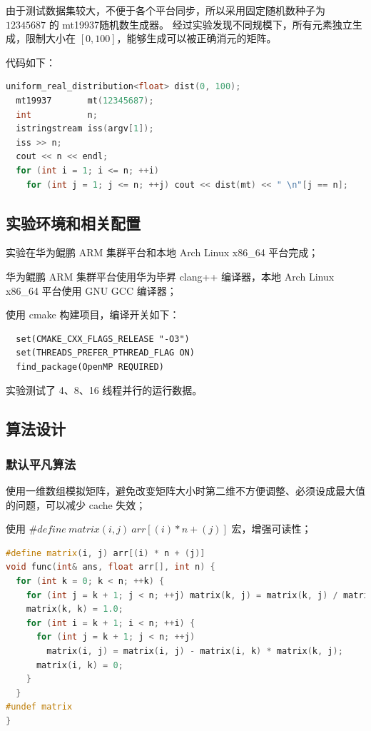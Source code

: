 \documentclass[a4paper]{article}
\begin{document}
由于测试数据集较大，不便于各个平台同步，所以采用固定随机数种子为 $12345687$ 的 mt19937随机数生成器。
经过实验发现不同规模下，所有元素独立生成，限制大小在 $[0, 100]$，能够生成可以被正确消元的矩阵。

代码如下：

\begin{lstlisting}[title=测试数据集生成器,frame=trbl,language={C++}]
  uniform_real_distribution<float> dist(0, 100);
  mt19937       mt(12345687);
  int           n;
  istringstream iss(argv[1]);
  iss >> n;
  cout << n << endl;
  for (int i = 1; i <= n; ++i)
    for (int j = 1; j <= n; ++j) cout << dist(mt) << " \n"[j == n];
\end{lstlisting}

\subsection{实验环境和相关配置}

实验在华为鲲鹏 ARM 集群平台和本地 Arch Linux x86\_64 平台完成；

华为鲲鹏 ARM 集群平台使用华为毕昇 clang++ 编译器，本地 Arch Linux x86\_64 平台使用 GNU GCC 编译器；

使用 cmake 构建项目，编译开关如下：

\begin{verbatim}
  set(CMAKE_CXX_FLAGS_RELEASE "-O3")
  set(THREADS_PREFER_PTHREAD_FLAG ON)
  find_package(OpenMP REQUIRED)
\end{verbatim}

实验测试了 4、8、16 线程并行的运行数据。

\subsection{算法设计}

\subsubsection{默认平凡算法}

使用一维数组模拟矩阵，避免改变矩阵大小时第二维不方便调整、必须设成最大值的问题，可以减少 cache 失效；

使用 $\#define\ matrix(i, j)\ arr[(i) * n + (j)]$ 宏，增强可读性；

\begin{lstlisting}[title=平凡算法,frame=trbl,language={C++}]
#define matrix(i, j) arr[(i) * n + (j)]
void func(int& ans, float arr[], int n) {
  for (int k = 0; k < n; ++k) {
    for (int j = k + 1; j < n; ++j) matrix(k, j) = matrix(k, j) / matrix(k, k);
    matrix(k, k) = 1.0;
    for (int i = k + 1; i < n; ++i) {
      for (int j = k + 1; j < n; ++j)
        matrix(i, j) = matrix(i, j) - matrix(i, k) * matrix(k, j);
      matrix(i, k) = 0;
    }
  }
#undef matrix
}
\end{lstlisting}
\end{document}

